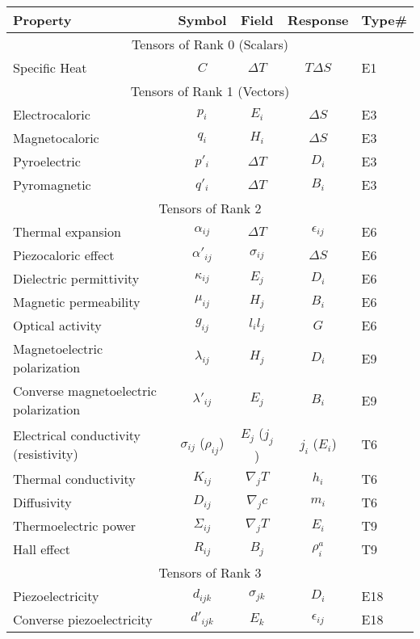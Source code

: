 \begin{table}
\centering\leavevmode
\begin{tabular}{|l|c|c|c|l|}
\hline
Property   &  Symbol   &  Field & Response & Type\#  \\
\hline
\hline
\multicolumn{5}{|c|}{Tensors of Rank 0 (Scalars)}\\
\hline
Specific Heat   &   $C$   & $\Delta T$ & $T\Delta S$ &   E1\\
\hline
\multicolumn{5}{|c|}{Tensors of Rank 1 (Vectors)}\\
\hline
Electrocaloric  &  $p_i$  & $E_i$ & $\Delta S$ & E3\\
Magnetocaloric & $q_i$  &  $H_i$ & $\Delta S$ & E3\\
Pyroelectric  &  $p'_i$  & $\Delta T$ & $D_i$ & E3\\
Pyromagnetic & $q'_i$  &  $\Delta T$ & $B_i$ & E3\\
\hline
\multicolumn{5}{|c|}{Tensors of Rank 2}\\
\hline
Thermal expansion  & $\alpha_{ij}$  & $\Delta T$ & $\epsilon_{ij}$ & E6\\
Piezocaloric effect  & $\alpha'_{ij}$  & $\sigma_{ij}$ & $\Delta S$ & E6\\
Dielectric permittivity & $\kappa_{ij}$  & $E_j$ & $D_i$ &  E6\\
Magnetic permeability & $\mu_{ij}$ & $H_j$ & $B_i$ & E6\\
Optical activity  &  $g_{ij}$  & $l_il_j$ & $G$ &  E6\\
Magnetoelectric polarization & $\lambda_{ij}$ & $H_j$ & $D_i$  & E9\\
Converse magnetoelectric polarization & $\lambda'_{ij}$ & $E_j$ & $B_i$  & E9\\
Electrical conductivity (resistivity) & $\sigma_{ij}$ ($\rho_{ij}$)  & $E_j$ ($j_j$) & $j_i$ ($E_i$) & T6\\
Thermal conductivity & $K_{ij}$  & $\nabla_j T$ & $h_i$ & T6\\
Diffusivity  &  $D_{ij}$  &$\nabla_j c$ & $m_i$ & T6\\
Thermoelectric power  &  $\Sigma_{ij}$ & $\nabla_j T$ & $E_i$ & T9\\
Hall effect  & $R_{ij}$  & $B_j$ & $\rho^a_{i}$ & T9\\
\hline
\multicolumn{5}{|c|}{Tensors of Rank 3}\\
\hline
Piezoelectricity  &  $d_{ijk}$  & $\sigma_{jk}$ & $D_i$ &  E18\\
Converse piezoelectricity  &  $d'_{ijk}$  & $E_k$ & $\epsilon_{ij}$ &  E18\\

\end{tabular}
\end{table}
